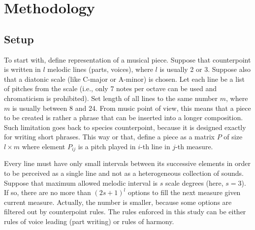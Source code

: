 \documentclass{article}
\begin{document}
\section{Methodology}
\label{sec:methodology}

\subsection{Setup}
\label{subsec:setup}

To start with, define representation of a musical piece. Suppose that counterpoint is written in $l$ melodic lines (parts, voices), where $l$ is usually 2 or 3. Suppose also that a diatonic scale (like C-major or A-minor) is chosen. Let each line be a list of pitches from the scale (i.e., only 7 notes per octave can be used and chromaticism is prohibited). Set length of all lines to the same number $m$, where $m$ is usually between 8 and 24. From music point of view, this means that a piece to be created is rather a phrase that can be inserted into a longer composition. Such limitation goes back to species counterpoint, because it is designed exactly for writing short phrases. This way or that, define a piece as a matrix $P$ of size $l \times m$ where element $P_{ij}$ is a pitch played in $i$-th line in $j$-th measure.

Every line must have only small intervals between its successive elements in order to be perceived as a single line and not as a heterogeneous collection of sounds. Suppose that maximum allowed melodic interval is $s$ scale degrees (here, $s = 3$). If so, there are no more than $(2s + 1)^l$ options to fill the next measure given current measure. Actually, the number is smaller, because some options are filtered out by counterpoint rules. The rules enforced in this study can be either rules of voice leading (part writing) or rules of harmony.
\end{document}

